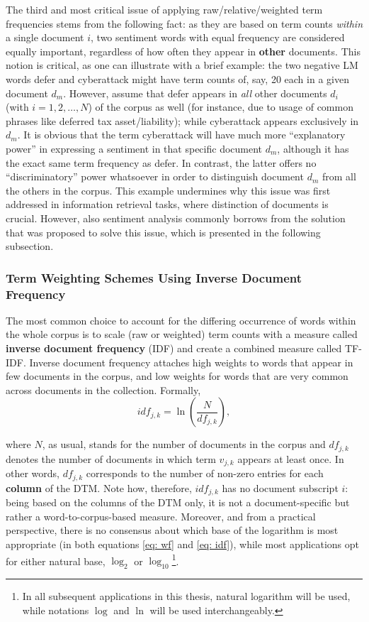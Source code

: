 The third and most critical issue of applying raw/relative/weighted term frequencies stems from the following fact: as they are based on term counts \textit{within} a single document $i$, two sentiment words with equal frequency are considered equally important, regardless of how often they appear in \textbf{other} documents. This notion is critical, as one can illustrate with a brief example: the two negative LM words \textsf{defer} and \textsf{cyberattack} might have term counts of, say, 20 each in a given document $d_m$. However, assume that \textsf{defer} appears in \textit{all} other documents $d_i$ (with $i = 1, 2, \dots, N$)  of the corpus as well (for instance, due to usage of common phrases like \textsf{deferred tax asset/liability}); while \textsf{cyberattack} appears exclusively in $d_m$. It is obvious that the term \textsf{cyberattack} will have much more \enquote{explanatory power} in expressing a sentiment in that specific document $d_m$, although it has the exact same term frequency as \textsf{defer}. In contrast, the latter offers no \enquote{discriminatory} power whatsoever in order to distinguish document $d_m$ from all the others in the corpus. This example undermines why this issue was first addressed in information retrieval tasks, where distinction of documents is crucial. However, also sentiment analysis commonly borrows from the solution that was proposed to solve this issue, which is presented in the following subsection. 

\subsubsection{Term Weighting Schemes Using Inverse Document Frequency}
\label{sssec: senti_termweighting_old}

The most common choice to account for the differing occurrence of words within the whole corpus is to scale (raw or weighted) term counts with a measure called \textbf{inverse document frequency} (IDF) and create a combined measure called TF-IDF. Inverse document frequency attaches high weights to words that appear in few documents in the corpus, and low weights for words that are very common across documents in the collection. Formally,
\begin{equation} \label{eq: idf}
idf_{j,k} = \ln \left(\dfrac{N}{df_{j,k}} \right),
\end{equation}

where $N$, as usual, stands for the number of documents in the corpus and ${df_{j,k}}$ denotes the number of documents in which term $v_{j,k}$ appears at least once. In other words, ${df_{j,k}}$ corresponds to the number of non-zero entries for each \textbf{column} of the DTM. Note how, therefore, $idf_{j,k}$ has no document subscript $i$: being based on the columns of the DTM only, it is not a document-specific but rather a word-to-corpus-based measure. Moreover, and from a practical perspective, there is no consensus about which base of the logarithm is most appropriate (in both equations \eqref{eq: wf} and \eqref{eq: idf}), while most applications opt for either natural base, $\log_2$ or $\log_{10}$\footnote{In all subsequent applications in this thesis, natural logarithm will be used, while notations $\log$ and $\ln$ will be used interchangeably.}.

